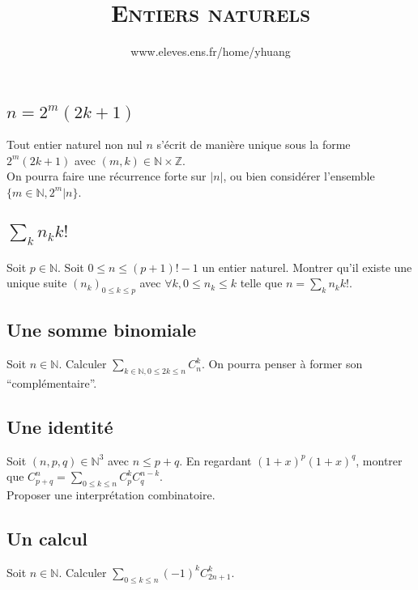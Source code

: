 \documentclass{article}
\begin{document}
\setcounter{section}{18}

\title{\textsc{Entiers naturels}}
\author{www.eleves.ens.fr/home/yhuang}
\date{}
\maketitle


\subsection{$n=2^m(2k+1)$}
Tout entier naturel non nul $n$ s'\'ecrit de mani\`ere unique sous la forme $2^{m}(2k+1)$ avec $(m,k)\in\mathbb{N}\times\mathbb{Z}$.\\
On pourra faire une r\'ecurrence forte sur $|n|$, ou bien consid\'erer l'ensemble $\{m\in\mathbb{N}, 2^m|n\}$.

\subsection{$\sum\limits_{k}n_k k!$}
Soit $p\in\mathbb{N}$. Soit $0\leq n\leq (p+1)!-1$ un entier naturel. Montrer qu'il existe une unique suite $(n_k)_{0\leq k\leq p}$ avec $\forall k, 0\leq n_k\leq k$ telle que $n=\sum\limits_{k}n_k k!$.

\subsection{Une somme binomiale}
Soit $n\in\mathbb{N}$. Calculer $\sum\limits_{k\in\mathbb{N}, 0\leq 2k\leq n}C_n^k$. On pourra penser \`a former son ``compl\'ementaire''.

\subsection{Une identit\'e}
Soit $(n,p,q)\in\mathbb{N}^3$ avec $n\leq p+q$. En regardant $(1+x)^p(1+x)^q$, montrer que $C_{p+q}^n=\sum\limits_{0\leq k\leq n}C_p^k C_q^{n-k}$.\\
Proposer une interpr\'etation combinatoire.

\subsection{Un calcul}
Soit $n\in\mathbb{N}$. Calculer $\sum\limits_{0\leq k\leq n}(-1)^kC_{2n+1}^k$.
\end{document}
